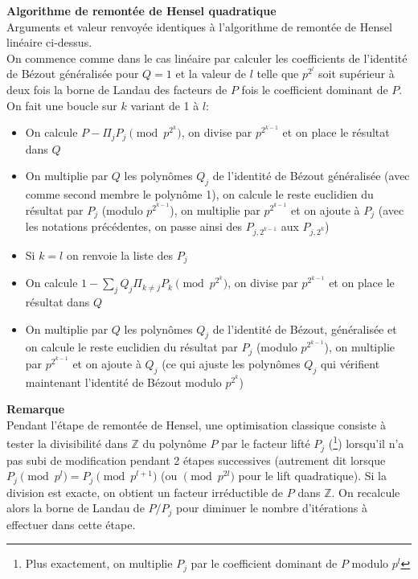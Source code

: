 \documentclass[a4paper,11pt]{article}
\newcommand{\Z}{{\mathbb{Z}}}
\begin{document}
{\bf Algorithme de remontée de Hensel quadratique}\\
Arguments et valeur renvoyée identiques à l'algorithme de remontée de Hensel
linéaire ci-dessus.\\
On commence comme dans le cas linéaire par calculer les coefficients
de l'identité de Bézout généralisée pour $Q=1$ et la valeur de $l$ telle
que $p^{2^l}$ soit supérieur à deux fois la borne de Landau des facteurs
de $P$ fois le coefficient dominant de $P$.\\
On fait une boucle sur $k$ variant de 1 à $l$:
\begin{itemize}
\item On calcule $P-\Pi_j P_j \pmod {p^{2^k}}$, on divise par $p^{2^{k-1}}$
et on place le résultat dans $Q$
\item On multiplie par $Q$ les polynômes $Q_j$ de l'identité de Bézout
généralisée (avec comme second membre le polynôme 1),
on calcule le reste euclidien du résultat par $P_j$ (modulo $p^{2^{k-1}}$), 
on multiplie par $p^{2^{k-1}}$ et on ajoute à $P_j$ (avec les notations
précédentes, on passe ainsi des $P_{j,2^{k-1}}$ aux $P_{j,2^k}$)
\item Si $k=l$ on renvoie la liste des $P_j$
\item On calcule $1-\sum_j Q_j \Pi_{k\neq j} P_k \pmod {p^{2^k}}$, on
divise par $p^{2^{k-1}}$ et on place le résultat dans $Q$
\item On multiplie par $Q$ les polynômes $Q_j$ de l'identité de Bézout,
généralisée et on calcule le reste euclidien du résultat par 
$P_j$ (modulo $p^{2^{k-1}}$), on multiplie par $p^{2^{k-1}}$ et 
on ajoute à $Q_j$ (ce qui ajuste les polynômes $Q_j$ qui vérifient
maintenant l'identité de Bézout modulo $p^{2^k}$)
\end{itemize}

{\bf Remarque}\\
Pendant l'étape de remontée de Hensel, une optimisation classique
consiste à tester la divisibilité dans $\Z$ du polynôme $P$ par le 
facteur lifté $P_j$ (\footnote{Plus exactement, on multiplie $P_j$ par le
coefficient dominant de $P$ modulo $p^l$})
lorsqu'il n'a pas subi de modification pendant 2 étapes successives
(autrement dit lorsque $P_j \pmod {p^l}=P_j \pmod {p^{l+1}}$ (ou
$\pmod {p^{2l}}$ pour le lift quadratique). Si la division
est exacte, on obtient un facteur irréductible de $P$ dans $\Z$.
On recalcule alors la borne de Landau de $P/P_j$ pour diminuer
le nombre d'itérations à effectuer dans cette étape.
\end{document}
